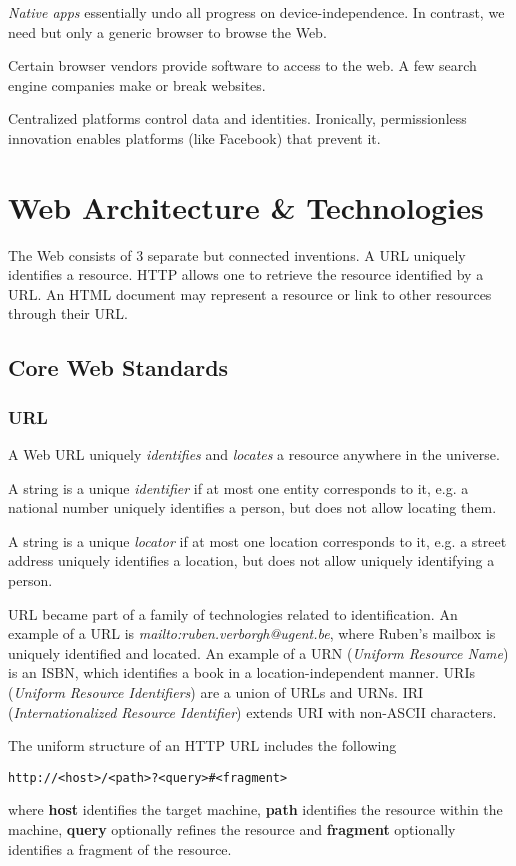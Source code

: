 \documentclass{report}
\begin{document}
\textit{Native apps} essentially undo
all progress on device-independence.
In contrast, we need but only
a generic browser to browse the Web.

Certain browser vendors provide
software to access to the web.
A few search engine companies make or break websites.

Centralized platforms control data and identities.
Ironically, permissionless innovation enables
platforms (like Facebook) that prevent it.

\chapter{Web Architecture \& Technologies}

The Web consists of 3 separate but connected inventions.
A URL uniquely identifies a resource.
HTTP allows one to retrieve the resource identified by a URL.
An HTML document may represent a resource
or link to other resources through their URL.

\section{Core Web Standards}

\subsection{URL}

A Web URL uniquely \emph{identifies} and \emph{locates}
a resource anywhere in the universe.

A string is a unique \emph{identifier} if
at most one entity corresponds to it,
e.g. a national number uniquely identifies a person,
but does not allow locating them.

A string is a unique \emph{locator} if
at most one location corresponds to it,
e.g. a street address uniquely identifies a location,
but does not allow uniquely identifying a person.

URL became part of a family of technologies related to identification.
An example of a URL is \textit{mailto:ruben.verborgh@ugent.be},
where Ruben's mailbox is uniquely identified and located.
An example of a URN (\textit{Uniform Resource Name}) is an ISBN,
which identifies a book in a location-independent manner.
URIs (\textit{Uniform Resource Identifiers})
are a union of URLs and URNs.
IRI (\textit{Internationalized Resource Identifier})
extends URI with non-ASCII characters.

The uniform structure of an HTTP URL includes the following
\begin{center}
  \texttt{http://<host>/<path>?<query>\#<fragment>}
\end{center}
where \textbf{host} identifies the target machine,
\textbf{path} identifies the resource within the machine,
\textbf{query} optionally refines the resource and
\textbf{fragment} optionally identifies a fragment of the resource.
\end{document}
